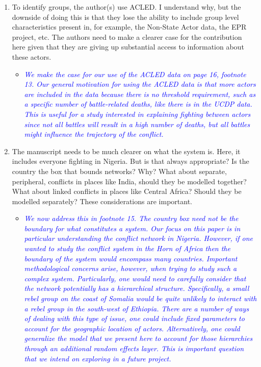 \begin{enumerate}
	\item To identify groups, the author(s) use ACLED. I understand why, but the downside of doing this is that they lose the ability to include group level characteristics present in, for example, the Non-State Actor data, the EPR project, etc. The authors need to make a clearer case for the contribution here given that they are giving up substantial access to information about these actors.
	\begin{itemize}
		\item \textcolor{blue}{ \emph{
		We make the case for our use of the ACLED data on page 16, footnote 13. Our general motivation for using the ACLED data is that more actors are included in the data because there is no threshold requirement, such as a specific number of battle-related deaths, like there is in the UCDP data. This is useful for a study interested in explaining fighting between actors since not all battles will result in a high number of deaths, but all battles might influence the trajectory of the conflict.
		}}
	\end{itemize}	
	\item The manuscript needs to be much clearer on what the system is. Here, it includes everyone fighting in Nigeria. But is that always appropriate? Is the country the box that bounds networks? Why? What about separate, peripheral, conflicts in places like India, should they be modelled together? What about linked conflicts in places like Central Africa? Should they be modelled separately? These considerations are important.
	\begin{itemize}
		\item \textcolor{blue}{ \emph{
		We now address this in footnote 15. The country box need not be the boundary for what constitutes a system. Our focus on this paper is in particular understanding the conflict network in Nigeria. However, if one wanted to study the conflict system in the Horn of Africa then the boundary of the system would encompass many countries. Important methodological concerns arise, however, when trying to study such a complex system. Particularly, one would need to carefully consider that the network potentially has a hierarchical structure. Specifically, a small rebel group on the coast of Somalia would be quite unlikely to interact with a rebel group in the south-west of Ethiopia. There are a number of ways of dealing with this type of issue, one could include fixed parameters to account for the geographic location of actors. Alternatively, one could generalize the model that we present here to account for those hierarchies through an additional random effects layer. This is important question that we intend on exploring in a future project. 
}}
\end{itemize}
\end{enumerate}
